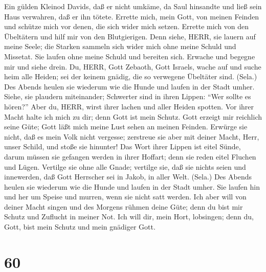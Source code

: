  Ein gülden Kleinod Davids, daß er nicht umkäme, da Saul
hinsandte und ließ sein Haus verwahren, daß er ihn tötete. Errette mich,
mein Gott, von meinen Feinden und schütze mich vor denen, die sich wider
mich setzen.  Errette mich von den Übeltätern und hilf mir
von den Blutgierigen.  Denn siehe, HERR, sie lauern auf
meine Seele; die Starken sammeln sich wider mich ohne meine Schuld und
Missetat.  Sie laufen ohne meine Schuld und bereiten sich.
Erwache und begegne mir und siehe drein.  Du, HERR, Gott
Zebaoth, Gott Israels, wache auf und suche heim alle Heiden; sei der
keinem gnädig, die so verwegene Übeltäter sind. (Sela.)  Des
Abends heulen sie wiederum wie die Hunde und laufen in der Stadt umher.
 Siehe, sie plaudern miteinander; Schwerter sind in ihren
Lippen: ``Wer sollte es hören?''  Aber du, HERR, wirst ihrer
lachen und aller Heiden spotten.  Vor ihrer Macht halte ich
mich zu dir; denn Gott ist mein Schutz.  Gott erzeigt mir
reichlich seine Güte; Gott läßt mich meine Lust sehen an meinen Feinden.
 Erwürge sie nicht, daß es mein Volk nicht vergesse;
zerstreue sie aber mit deiner Macht, Herr, unser Schild, und stoße sie
hinunter!  Das Wort ihrer Lippen ist eitel Sünde, darum
müssen sie gefangen werden in ihrer Hoffart; denn sie reden eitel
Fluchen und Lügen.  Vertilge sie ohne alle Gnade; vertilge
sie, daß sie nichts seien und innewerden, daß Gott Herrscher sei in
Jakob, in aller Welt. (Sela.)  Des Abends heulen sie
wiederum wie die Hunde und laufen in der Stadt umher.  Sie
laufen hin und her um Speise und murren, wenn sie nicht satt werden.
 Ich aber will von deiner Macht singen und des Morgens
rühmen deine Güte; denn du bist mir Schutz und Zuflucht in meiner Not.
 Ich will dir, mein Hort, lobsingen; denn du, Gott, bist
mein Schutz und mein gnädiger Gott.

\hypertarget{section-59}{%
\section{60}\label{section-59}}

